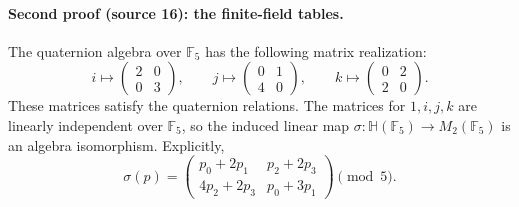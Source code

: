 \documentclass[11pt,letterpaper]{article}
\numberwithin{equation}{section}
\theoremstyle{definition}
\theoremstyle{remark}
\newcommand{\HH}{\mathbb H}
\newcommand{\FF}{\mathbb F}
\begin{document}
\paragraph{Second proof (source 16): the finite-field tables.}
The quaternion algebra over $\FF_5$ has the following matrix realization:
\begin{equation}
 i\longmapsto\begin{pmatrix}2&0\\0&3\end{pmatrix},\qquad
 j\longmapsto\begin{pmatrix}0&1\\4&0\end{pmatrix},\qquad
 k\longmapsto\begin{pmatrix}0&2\\2&0\end{pmatrix}.
 \label{pqc:dr:eq:split}
\end{equation}
These matrices satisfy the quaternion relations. The matrices for
$1,i,j,k$ are linearly independent over $\FF_5$, so the induced linear
map $\sigma:\HH(\FF_5)\to M_2(\FF_5)$ is an algebra isomorphism.
Explicitly,
\begin{equation}
 \sigma(p)=
 \begin{pmatrix}
 p_0+2p_1&p_2+2p_3\\
 4p_2+2p_3&p_0+3p_1
 \end{pmatrix}\pmod5.
 \label{pqc:dr:eq:sigma}
\end{equation}
\end{document}
